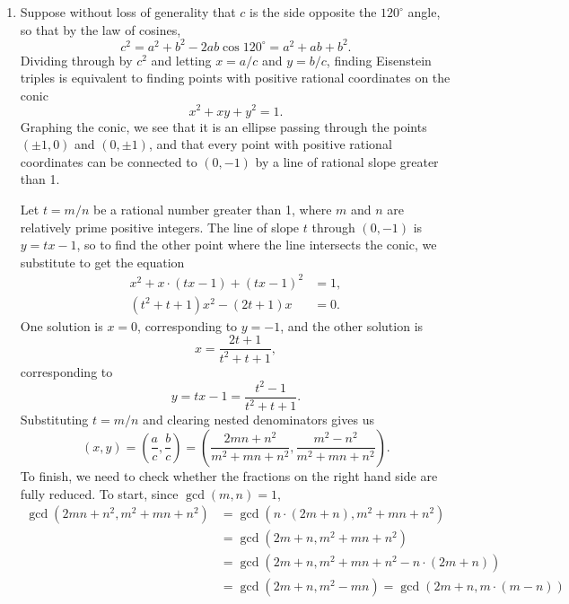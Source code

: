 \begin{enumerate}
\item Suppose without loss of generality that $c$ is the side opposite the $120^{\circ}$ angle, so that by the law of cosines,
\begin{equation*}
c^2 = a^2 + b^2 - 2ab\cos 120^{\circ} = a^2 + ab + b^2.
\end{equation*}
Dividing through by $c^2$ and letting $x = a/c$ and $y = b/c$, finding Eisenstein triples is equivalent to finding points with positive rational coordinates on the conic
\begin{equation*}
x^2 + xy + y^2 = 1.
\end{equation*}
Graphing the conic, we see that it is an ellipse passing through the points $(\pm 1, 0)$ and $(0, \pm 1)$, and that every point with positive rational coordinates can be connected to $(0,-1)$ by a line of rational slope greater than 1.\par
Let $t = m/n$ be a rational number greater than 1, where $m$ and $n$ are relatively prime positive integers. The line of slope $t$ through $(0,-1)$ is $y = tx - 1$, so to find the other point where the line intersects the conic, we substitute to get the equation
\begin{align*}
x^2 + x\cdot (tx - 1) + (tx - 1)^2 &= 1, \\
(t^2 + t + 1)x^2 - (2t + 1)x &= 0.
\end{align*}
One solution is $x = 0$, corresponding to $y = -1$, and the other solution is
\begin{equation*}
x = \frac{2t + 1}{t^2 + t + 1},
\end{equation*}
corresponding to
\begin{equation*}
y = tx - 1 = \frac{t^2 - 1}{t^2 + t + 1}.
\end{equation*}
Substituting $t = m/n$ and clearing nested denominators gives us
\begin{equation*}
(x,y) = \left(\frac{a}{c},\frac{b}{c}\right) = \left(\frac{2mn + n^2}{m^2 + mn + n^2}, \frac{m^2 - n^2}{m^2 + mn + n^2}\right).
\end{equation*}
To finish, we need to check whether the fractions on the right hand side are fully reduced. To start, since $\gcd(m,n) = 1$,
\begin{align*}
\gcd(2mn + n^2, m^2 + mn + n^2) &= \gcd(n\cdot (2m + n), m^2 + mn + n^2) \\
&= \gcd(2m + n, m^2 + mn + n^2) \\
&= \gcd(2m + n, m^2 + mn + n^2 - n\cdot (2m + n)) \\
&= \gcd(2m + n, m^2 - mn) = \gcd(2m + n, m\cdot (m - n)) \\

\end{align*}
\end{enumerate}
